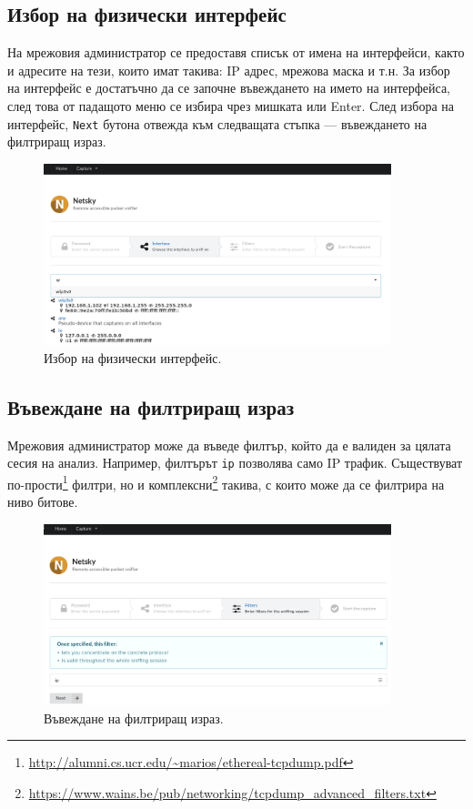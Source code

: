 \documentclass[12pt,a4paper,oneside]{book}
\begin{document}
\subsection{Избор на физически интерфейс}

На мрежовия администратор се предоставя списък от имена на интерфейси, както и
адресите на тези, които имат такива: IP адрес, мрежова маска и т.н. За избор на
интерфейс е достатъчно да се започне въвеждането на името на интерфейса, след
това от падащото меню се избира чрез мишката или Enter. След избора на интерфейс,
\texttt{Next} бутона отвежда към следващата стъпка ---
въвеждането на филтриращ израз.

\begin{figure}[h!]
  \centering
  \includegraphics[width=0.9\textwidth]{figures/screenshots/interface.png}
  \caption{Избор на физически интерфейс.}
  \label{screenshots_interface_fig}
\end{figure}

\subsection{Въвеждане на филтриращ израз}

Мрежовия администратор може да въведе филтър, който да е валиден за цялата сесия
на анализ. Например, филтърът \texttt{ip} позволява само IP трафик. Съществуват
по-прости\footnote{\url{http://alumni.cs.ucr.edu/~marios/ethereal-tcpdump.pdf}}
филтри,
но и
комплексни\footnote{\url{https://www.wains.be/pub/networking/tcpdump_advanced_filters.txt}}
такива, с които може да се филтрира на ниво битове.

\begin{figure}[h!]
  \centering
  \includegraphics[width=0.9\textwidth]{figures/screenshots/filter.png}
  \caption{Въвеждане на филтриращ израз.}
  \label{screenshots_filter_fig}
\end{figure}
\end{document}
